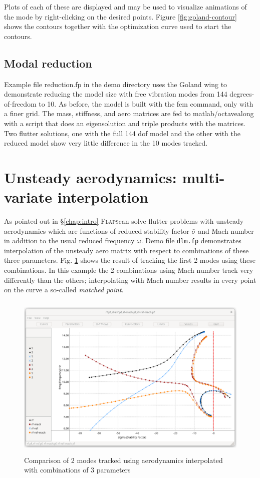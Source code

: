 \documentclass[11pt,openany,twoside]{book}
\numberwithin{equation}{section}		%
\newcommand{\Cmd}[1]{{\sf #1}}
\newcommand{\Code}[1]{{\small\tt #1}}
\newcommand{\Flaps}{\textsc{Flaps\:}}
\newcommand{\Octlab}{\Cmd{matlab}/\Cmd{octave}\:}
\newcommand{\Sectref}[1]{\S\ref{#1}}
\newcommand{\Figref}[1]{Fig. \ref{#1}}  %
\begin{document}
Plots of each of these are displayed and may be used to visualize animations
of the mode by right-clicking on the desired points.
Figure \ref{fig:goland-contour} shows the contours together with the optimization
curve used to start the contours.

\subsection{Modal reduction}\label{ex:reduction}
Example file reduction.fp in the demo directory uses the Goland wing to
demonstrate reducing the model size with free vibration modes from 144
degrees-of-freedom to 10. As before, the model is built with the \Cmd{fem}
command, only with a finer grid. The mass, stiffness, and aero matrices
are fed to \Octlab along with a script that does an eigensolution and
triple products with the matrices. Two flutter solutions, one with the
full 144 dof model and the other with the reduced model show very little
difference in the 10 modes tracked.

\section{Unsteady aerodynamics: multi-variate interpolation}\label{ex:unsteady-aero}
As pointed out in \Sectref{chap:intro} \Flaps can solve flutter problems
with unsteady aerodynamics which are functions of reduced stability factor
$\bar{\sigma}$ and Mach number in addition to the usual reduced frequency
$\bar{\omega}$. Demo file \Code{dlm.fp}
demonstrates interpolation of
the unsteady aero matrix with respect to combinations of these three
parameters. \Figref{fig:dlm-compare} shows the result of tracking
the first 2 modes using these combinations.
In this example the 2 combinations using Mach number track very differently
than the others; interpolating with Mach number results in every point on
the curve a so-called \emph{matched point}\cite{demasi2024introduction}.
\begin{figure}[ht]
		\includegraphics[height=8cm,width=12cm]{dlm-compare.png}
	\centering
	\caption{Comparison of 2 modes tracked using aerodynamics interpolated with
			combinations of 3 parameters}\label{fig:dlm-compare}
\end{figure}
\end{document}
